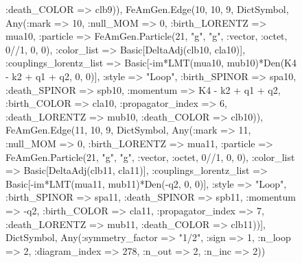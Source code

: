 \documentclass{revtex4}
\begin{document}
\begin{figure}[!htb]
\begin{center}
{:death_COLOR => clb9)), FeAmGen.Edge(10, 10, 9, Dict{Symbol, Any}(:mark => 10, :null_MOM => 0, :birth_LORENTZ => mua10, :particle => FeAmGen.Particle(21, "g", "g", :vector, :octet, 0//1, 0, 0), :color_list => Basic[DeltaAdj(clb10, cla10)], :couplings_lorentz_list => Basic[-im*LMT(mua10, mub10)*Den(K4 - k2 + q1 + q2, 0, 0)], :style => "Loop", :birth_SPINOR => spa10, :death_SPINOR => spb10, :momentum => K4 - k2 + q1 + q2, :birth_COLOR => cla10, :propagator_index => 6, :death_LORENTZ => mub10, :death_COLOR => clb10)), FeAmGen.Edge(11, 10, 9, Dict{Symbol, Any}(:mark => 11, :null_MOM => 0, :birth_LORENTZ => mua11, :particle => FeAmGen.Particle(21, "g", "g", :vector, :octet, 0//1, 0, 0), :color_list => Basic[DeltaAdj(clb11, cla11)], :couplings_lorentz_list => Basic[-im*LMT(mua11, mub11)*Den(-q2, 0, 0)], :style => "Loop", :birth_SPINOR => spa11, :death_SPINOR => spb11, :momentum => -q2, :birth_COLOR => cla11, :propagator_index => 7, :death_LORENTZ => mub11, :death_COLOR => clb11))], Dict{Symbol, Any}(:symmetry_factor => "1/2", :sign => 1, :n_loop => 2, :diagram_index => 278, :n_out => 2, :n_inc => 2)) 
}
\end{center}
\end{figure}
\end{document}
